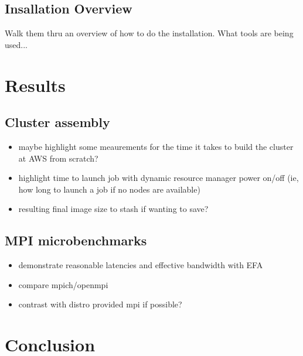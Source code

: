 \documentclass[sigconf,screen]{acmart}
\begin{document}
\subsection{Insallation Overview}
Walk them thru an overview of how to do the installation. What tools are being
used...

\lipsum[4]

\section{Results}
\lipsum[6]
\subsection{Cluster assembly}
\begin{itemize}
\item maybe highlight some meaurements for the time it takes to build the
  cluster at AWS from scratch?
\item highlight time to launch job with dynamic resource manager power on/off
  (ie, how long to launch a job if no nodes are available)
\item resulting final image size to stash if wanting to save?
\end{itemize}

\subsection{MPI microbenchmarks}
\begin {itemize}
\item demonstrate reasonable latencies and effective bandwidth with EFA
\item compare mpich/openmpi
\item contrast with distro provided mpi if possible?
\end{itemize}
\lipsum[7]

\section{Conclusion}
\lipsum[8]

\begin{acks}
  \lipsum[9]
\end{acks}

\nocite{*}



\end{document}
